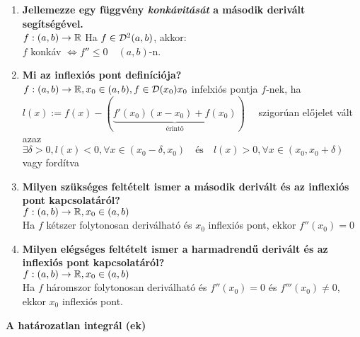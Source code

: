 \documentclass[a4paper,11pt]{article}
\begin{document}
\begin{enumerate}
	\item \textbf{Jellemezze egy függvény \textit{konkávitását} a második derivált segítségével.}\\[0.1cm]$f:(a,b)\to\mathbb{R}$ Ha $f\in\mathcal{D}^2(a,b)$, akkor:\\[0.1cm] $f$ konkáv $\Leftrightarrow f''\leq0\quad(a,b)$-n.
	\item\textbf{Mi az inflexiós pont definíciója?}\\[0.1cm]
	$f:(a,b)\to\mathbb{R},x_0\in(a,b),f\in\mathcal{D}(x_0)\\[0.2cm]x_0$ infelxiós pontja $f$-nek, ha
	$l(x):=f(x)-(\underbrace{f'(x_0)(x-x_0)+f(x_0)}_{\text{érintő}})\quad$
	szigorúan előjelet vált\\[0.2cm]azaz $\exists\delta>0,l(x)<0,\forall x\in
	(x_0-\delta,x_0)\quad\text{és}\quad l(x)>0,\forall x\in(x_0,x_0+\delta)\quad$
	vagy fordítva
	\item\textbf{Milyen szükséges feltételt ismer a második derivált és az
	inflexiós pont kapcsolatáról?}\\[0.1cm]
	$f:(a,b)\to\mathbb{R},x_0\in(a,b)$\\[0.1cm]Ha $f$ kétszer folytonosan
	deriválható és $x_0$ inflexiós pont, ekkor $f''(x_0)=0$
	\item\textbf{Milyen elégséges feltételt ismer a harmadrendű derivált és az
	inflexiós pont kapcsolatáról?}\\[0.1cm]$f:(a,b)\to\mathbb{R},x_0\in(a,b)$
	\\[0.1cm]Ha $f$ háromszor folytonosan deriválható és $f''(x_0)=0$ és $f'''(x_0)\neq0$, ekkor	$x_0$ inflexiós pont.
\end{enumerate}
\textbf{{\large A határozatlan integrál (\prfv ek)}}
\end{document}
